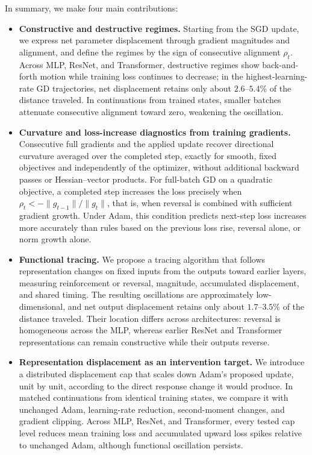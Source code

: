 In summary, we make four main contributions:
\begin{itemize}
\item \textbf{Constructive and destructive regimes.} Starting from the SGD update, we express net parameter displacement through gradient magnitudes and alignment, and define the regimes by the sign of consecutive alignment \(\rho_t\). Across MLP, ResNet, and Transformer, destructive regimes show back-and-forth motion while training loss continues to decrease; in the highest-learning-rate GD trajectories, net displacement retains only about \(2.6\)--\(5.4\%\) of the distance traveled. In continuations from trained states, smaller batches attenuate consecutive alignment toward zero, weakening the oscillation.

\item \textbf{Curvature and loss-increase diagnostics from training gradients.} Consecutive full gradients and the applied update recover directional curvature averaged over the completed step, exactly for smooth, fixed objectives and independently of the optimizer, without additional backward passes or Hessian--vector products. For full-batch GD on a quadratic objective, a completed step increases the loss precisely when \(\rho_t<-\|g_{t-1}\|/\|g_t\|\), that is, when reversal is combined with sufficient gradient growth. Under Adam, this condition predicts next-step loss increases more accurately than rules based on the previous loss rise, reversal alone, or norm growth alone.

\item \textbf{Functional tracing.} We propose a tracing algorithm that follows representation changes on fixed inputs from the outputs toward earlier layers, measuring reinforcement or reversal, magnitude, accumulated displacement, and shared timing. The resulting oscillations are approximately low-dimensional, and net output displacement retains only about \(1.7\)--\(3.5\%\) of the distance traveled. Their location differs across architectures: reversal is homogeneous across the MLP, whereas earlier ResNet and Transformer representations can remain constructive while their outputs reverse.

\item \textbf{Representation displacement as an intervention target.} We introduce a distributed displacement cap that scales down Adam's proposed update, unit by unit, according to the direct response change it would produce. In matched continuations from identical training states, we compare it with unchanged Adam, learning-rate reduction, second-moment changes, and gradient clipping. Across MLP, ResNet, and Transformer, every tested cap level reduces mean training loss and accumulated upward loss spikes relative to unchanged Adam, although functional oscillation persists.

\end{itemize}

